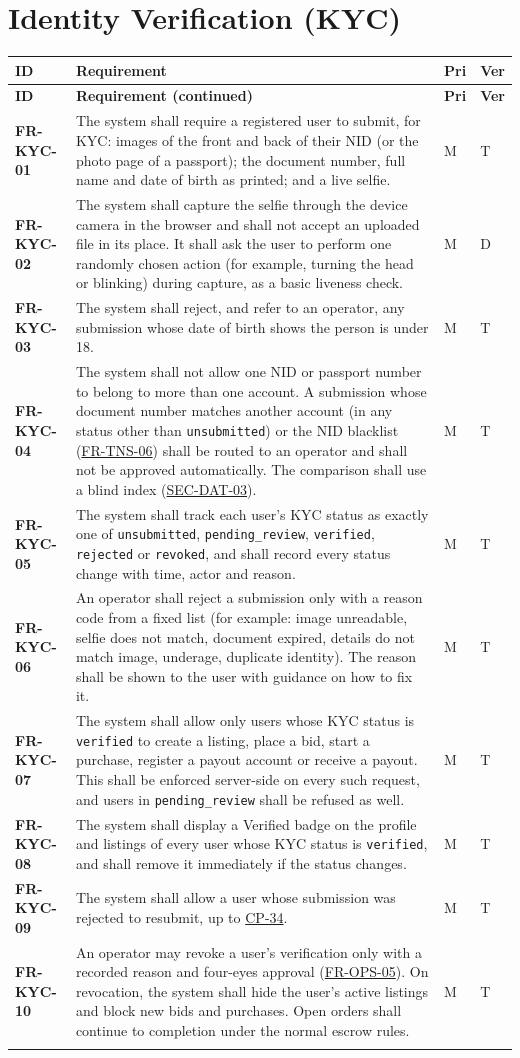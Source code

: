 \documentclass[11pt,a4paper]{report}
\makeatletter
\newenvironment{reqs}{%
  \small
  \begin{longtable}{@{}>{\raggedright\arraybackslash}p{2.35cm}
                       >{\raggedright\arraybackslash}p{10.3cm}
                       >{\centering\arraybackslash}p{0.7cm}
                       >{\centering\arraybackslash}p{0.7cm}@{}}
  \toprule
  \textbf{ID} & \textbf{Requirement} & \textbf{Pri} & \textbf{Ver} \\
  \midrule
  \endfirsthead
  \toprule
  \textbf{ID} & \textbf{Requirement (continued)} & \textbf{Pri} & \textbf{Ver} \\
  \midrule
  \endhead
  \bottomrule
  \endfoot
}{\end{longtable}}
\newcommand{\req}[5]{\leavevmode\textbf{#1}\hypertarget{#1}{} & #5 & #2 & #3 \\ \addlinespace[2pt]}
\newcommand{\rr}[1]{\hyperlink{#1}{#1}}
\newcommand{\cp}[1]{\hyperlink{#1}{#1}}
\makeatother
\begin{document}
\section{Identity Verification (KYC)}
\begin{reqs}
\req{FR-KYC-01}{M}{T}{FR-4}{The system shall require a registered user to submit, for KYC: images of the front and back of their NID (or the photo page of a passport); the document number, full name and date of birth as printed; and a live selfie.}
\req{FR-KYC-02}{M}{D}{new}{The system shall capture the selfie through the device camera in the browser and shall not accept an uploaded file in its place. It shall ask the user to perform one randomly chosen action (for example, turning the head or blinking) during capture, as a basic liveness check.}
\req{FR-KYC-03}{M}{T}{new}{The system shall reject, and refer to an operator, any submission whose date of birth shows the person is under 18.}
\req{FR-KYC-04}{M}{T}{new}{The system shall not allow one NID or passport number to belong to more than one account. A submission whose document number matches another account (in any status other than \texttt{unsubmitted}) or the NID blacklist (\rr{FR-TNS-06}) shall be routed to an operator and shall not be approved automatically. The comparison shall use a blind index (\rr{SEC-DAT-03}).}
\req{FR-KYC-05}{M}{T}{FR-6}{The system shall track each user's KYC status as exactly one of \texttt{unsubmitted}, \texttt{pending\_review}, \texttt{verified}, \texttt{rejected} or \texttt{revoked}, and shall record every status change with time, actor and reason.}
\req{FR-KYC-06}{M}{T}{FR-6}{An operator shall reject a submission only with a reason code from a fixed list (for example: image unreadable, selfie does not match, document expired, details do not match image, underage, duplicate identity). The reason shall be shown to the user with guidance on how to fix it.}
\req{FR-KYC-07}{M}{T}{FR-7}{The system shall allow only users whose KYC status is \texttt{verified} to create a listing, place a bid, start a purchase, register a payout account or receive a payout. This shall be enforced server-side on every such request, and users in \texttt{pending\_review} shall be refused as well.}
\req{FR-KYC-08}{M}{T}{FR-8}{The system shall display a Verified badge on the profile and listings of every user whose KYC status is \texttt{verified}, and shall remove it immediately if the status changes.}
\req{FR-KYC-09}{M}{T}{FR-9}{The system shall allow a user whose submission was rejected to resubmit, up to \cp{CP-34}.}
\req{FR-KYC-10}{M}{T}{new}{An operator may revoke a user's verification only with a recorded reason and four-eyes approval (\rr{FR-OPS-05}). On revocation, the system shall hide the user's active listings and block new bids and purchases. Open orders shall continue to completion under the normal escrow rules.}

\end{reqs}
\end{document}
